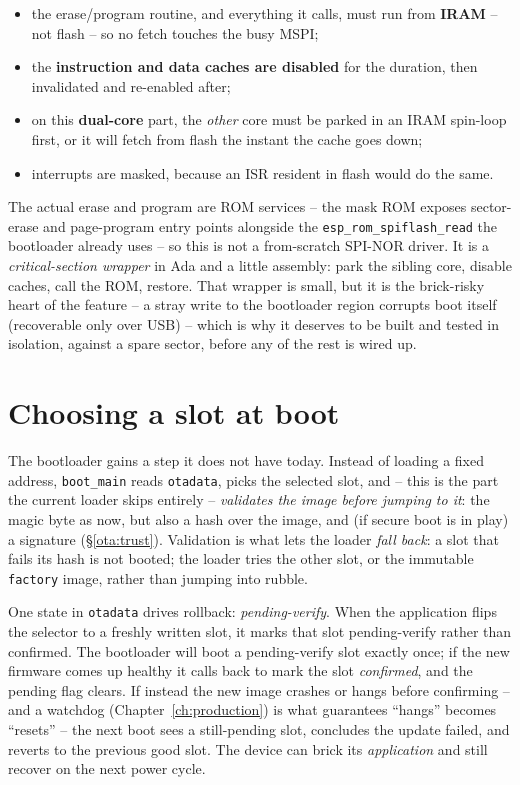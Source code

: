 \begin{itemize}
\item the erase/program routine, and everything it calls, must run from
  \textbf{IRAM} -- not flash -- so no fetch touches the busy MSPI;
\item the \textbf{instruction and data caches are disabled} for the duration, then
  invalidated and re-enabled after;
\item on this \textbf{dual-core} part, the \emph{other} core must be parked in an
  IRAM spin-loop first, or it will fetch from flash the instant the cache goes down;
\item interrupts are masked, because an ISR resident in flash would do the same.
\end{itemize}

The actual erase and program are ROM services -- the mask ROM exposes sector-erase
and page-program entry points alongside the \texttt{esp\_rom\_spiflash\_read} the
bootloader already uses -- so this is not a from-scratch SPI-NOR driver. It is a
\emph{critical-section wrapper} in Ada and a little assembly: park the sibling core,
disable caches, call the ROM, restore. That wrapper is small, but it is the
brick-risky heart of the feature -- a stray write to the bootloader region corrupts
boot itself (recoverable only over USB) -- which is why it deserves to be built and
tested in isolation, against a spare sector, before any of the rest is wired up.

\section{Choosing a slot at boot}

The bootloader gains a step it does not have today. Instead of loading a fixed
address, \texttt{boot\_main} reads \texttt{otadata}, picks the selected slot, and --
this is the part the current loader skips entirely -- \emph{validates the image
before jumping to it}: the magic byte as now, but also a hash over the image, and
(if secure boot is in play) a signature (\S\ref{ota:trust}). Validation is what lets
the loader \emph{fall back}: a slot that fails its hash is not booted; the loader
tries the other slot, or the immutable \texttt{factory} image, rather than jumping
into rubble.

One state in \texttt{otadata} drives rollback: \emph{pending-verify}. When the
application flips the selector to a freshly written slot, it marks that slot
pending-verify rather than confirmed. The bootloader will boot a pending-verify slot
exactly once; if the new firmware comes up healthy it calls back to mark the slot
\emph{confirmed}, and the pending flag clears. If instead the new image crashes or
hangs before confirming -- and a watchdog (Chapter~\ref{ch:production}) is what
guarantees ``hangs'' becomes ``resets'' -- the next boot sees a still-pending slot,
concludes the update failed, and reverts to the previous good slot. The device can
brick its \emph{application} and still recover on the next power cycle.

